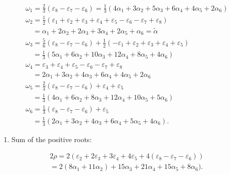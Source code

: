 \[
\begin{array}{l} \omega_ {1} = \frac {2}{3} (\varepsilon_ {8} - \varepsilon_ {7} - \varepsilon_ {6}) = \frac {1}{3} (4 \alpha_ {1} + 3 \alpha_ {2} + 5 \alpha_ {3} + 6 \alpha_ {4} + 4 \alpha_ {5} + 2 \alpha_ {6}) \\ \omega_ {2} = \frac {1}{2} (\varepsilon_ {1} + \varepsilon_ {2} + \varepsilon_ {3} + \varepsilon_ {4} + \varepsilon_ {5} - \varepsilon_ {6} - \varepsilon_ {7} + \varepsilon_ {8}) \\ \quad = \alpha_ {1} + 2 \alpha_ {2} + 2 \alpha_ {3} + 3 \alpha_ {4} + 2 \alpha_ {5} + \alpha_ {6} = \tilde {\alpha} \\ \omega_ {3} = \frac {5}{6} (\varepsilon_ {8} - \varepsilon_ {7} - \varepsilon_ {6}) + \frac {1}{2} (- \varepsilon_ {1} + \varepsilon_ {2} + \varepsilon_ {3} + \varepsilon_ {4} + \varepsilon_ {5}) \\ \quad = \frac {1}{3} (5 \alpha_ {1} + 6 \alpha_ {2} + 10 \alpha_ {3} + 12 \alpha_ {4} + 8 \alpha_ {5} + 4 \alpha_ {6}) \\ \omega_ {4} = \varepsilon_ {3} + \varepsilon_ {4} + \varepsilon_ {5} - \varepsilon_ {6} - \varepsilon_ {7} + \varepsilon_ {8} \\ \quad = 2 \alpha_ {1} + 3 \alpha_ {2} + 4 \alpha_ {3} + 6 \alpha_ {4} + 4 \alpha_ {5} + 2 \alpha_ {6} \\ \omega_ {5} = \frac {2}{3} (\varepsilon_ {8} - \varepsilon_ {7} - \varepsilon_ {6}) + \varepsilon_ {4} + \varepsilon_ {5} \\ \quad = \frac {1}{3} (4 \alpha_ {1} + 6 \alpha_ {2} + 8 \alpha_ {3} + 12 \alpha_ {4} + 10 \alpha_ {5} + 5 \alpha_ {6}) \\ \omega_ {6} = \frac {1}{3} (\varepsilon_ {8} - \varepsilon_ {7} - \varepsilon_ {6}) + \varepsilon_ {5} \\ \quad = \frac {1}{3} (2 \alpha_ {1} + 3 \alpha_ {2} + 4 \alpha_ {3} + 6 \alpha_ {4} + 5 \alpha_ {5} + 4 \alpha_ {6}). \end{array}
\]

\begin{enumerate}
\def\labelenumi{(\Roman{enumi})}
\setcounter{enumi}{6}
\tightlist
\item
  Sum of the positive roots:
\end{enumerate}

\[
\begin{array}{l} 2 \rho = 2 (\varepsilon_ {2} + 2 \varepsilon_ {3} + 3 \varepsilon_ {4} + 4 \varepsilon_ {5} + 4 (\varepsilon_ {8} - \varepsilon_ {7} - \varepsilon_ {6})) \\ = 2 (8 \alpha_ {1} + 11 \alpha_ {2}) + 15 \alpha_ {3} + 21 \alpha_ {4} + 15 \alpha_ {5} + 8 \alpha_ {6}). \end{array}
\]

